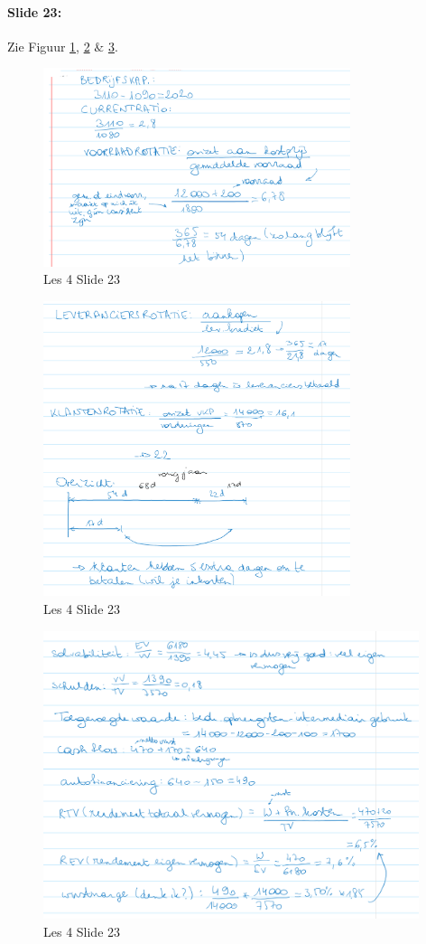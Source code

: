 \documentclass[10pt,a4paper]{report}
\begin{document}
\paragraph{Slide 23:} Zie Figuur \ref{les04_04}, \ref{les04_05} $\&$ \ref{les04_06}.

\begin{figure}[h!]
\centering
\includegraphics[width=90mm]{Les04_04.png}
\caption{Les 4 Slide 23} 
\label{les04_04}
\end{figure}

\begin{figure}[h!]
\centering
\includegraphics[width=90mm]{Les04_05.png}
\caption{Les 4 Slide 23} 
\label{les04_05}
\end{figure}

\begin{figure}[h!]
\centering
\includegraphics[width=110mm]{Les04_06.png}
\caption{Les 4 Slide 23} 
\label{les04_06}
\end{figure}
\end{document}
